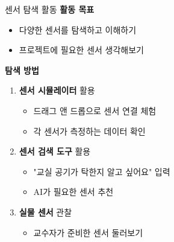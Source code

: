 \documentclass[aspectratio=169]{beamer}
\begin{document}
\begin{frame}{센서 탐색 활동}
  \textbf{활동 목표}
  \begin{itemize}
    \item 다양한 센서를 탐색하고 이해하기
    \item 프로젝트에 필요한 센서 생각해보기
  \end{itemize}
  
  \vspace{1em}
  
  \textbf{탐색 방법}
  \begin{enumerate}
    \item \textbf{센서 시뮬레이터} 활용
    \begin{itemize}
      \item 드래그 앤 드롭으로 센서 연결 체험
      \item 각 센서가 측정하는 데이터 확인
    \end{itemize}
    
    \item \textbf{센서 검색 도구} 활용
    \begin{itemize}
      \item "교실 공기가 탁한지 알고 싶어요" 입력
      \item AI가 필요한 센서 추천
    \end{itemize}
    
    \item \textbf{실물 센서} 관찰
    \begin{itemize}
      \item 교수자가 준비한 센서 둘러보기
    \end{itemize}
  \end{enumerate}
\end{frame}
\end{document}
